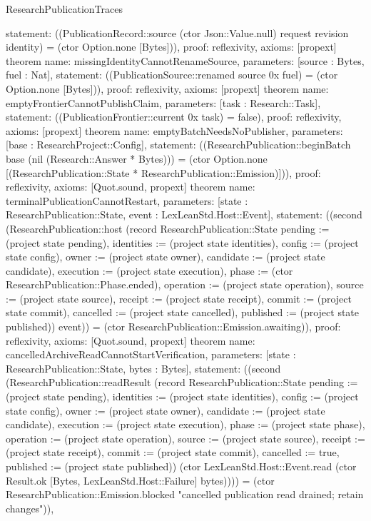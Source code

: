 \begin{lexlean}{ResearchPublicationTraces}
\begin{semanticmodule}
{ statement: ((PublicationRecord::source (ctor Json::Value.null) request revision identity) = (ctor Option.none [Bytes])),
 proof: reflexivity{},
 axioms: [propext]
}
theorem{
 name: missingIdentityCannotRenameSource,
 parameters: [source : Bytes, fuel : Nat],
 statement: ((PublicationSource::renamed source 0x fuel) = (ctor Option.none [Bytes])),
 proof: reflexivity{},
 axioms: [propext]
}
theorem{
 name: emptyFrontierCannotPublishClaim,
 parameters: [task : Research::Task],
 statement: ((PublicationFrontier::current 0x task) = false),
 proof: reflexivity{},
 axioms: [propext]
}
theorem{
 name: emptyBatchNeedsNoPublisher,
 parameters: [base : ResearchProject::Config],
 statement: ((ResearchPublication::beginBatch base (nil (Research::Answer * Bytes))) = (ctor Option.none [(ResearchPublication::State * ResearchPublication::Emission)])),
 proof: reflexivity{},
 axioms: [Quot.sound, propext]
}
theorem{
 name: terminalPublicationCannotRestart,
 parameters: [state : ResearchPublication::State, event : LexLeanStd.Host::Event],
 statement: ((second (ResearchPublication::host (record ResearchPublication::State {pending := (project state pending), identities := (project state identities), config := (project state config), owner := (project state owner), candidate := (project state candidate), execution := (project state execution), phase := (ctor ResearchPublication::Phase.ended), operation := (project state operation), source := (project state source), receipt := (project state receipt), commit := (project state commit), cancelled := (project state cancelled), published := (project state published)}) event)) = (ctor ResearchPublication::Emission.awaiting)),
 proof: reflexivity{},
 axioms: [Quot.sound, propext]
}
theorem{
 name: cancelledArchiveReadCannotStartVerification,
 parameters: [state : ResearchPublication::State, bytes : Bytes],
 statement: ((second (ResearchPublication::readResult (record ResearchPublication::State {pending := (project state pending), identities := (project state identities), config := (project state config), owner := (project state owner), candidate := (project state candidate), execution := (project state execution), phase := (project state phase), operation := (project state operation), source := (project state source), receipt := (project state receipt), commit := (project state commit), cancelled := true, published := (project state published)}) (ctor LexLeanStd.Host::Event.read (ctor Result.ok [Bytes, LexLeanStd.Host::Failure] bytes)))) = (ctor ResearchPublication::Emission.blocked "cancelled publication read drained; retain changes")),
}
\end{semanticmodule}
\end{lexlean}
